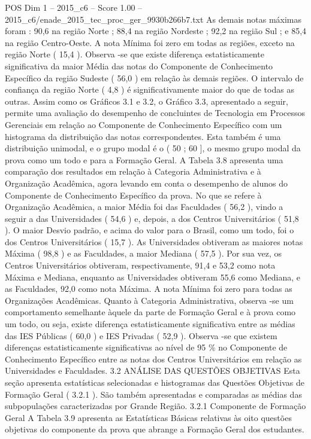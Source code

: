 \begin{textsample}{POS Dim 1 – 2015\_c6 – Score 1.00 – 2015\_c6/enade\_2015\_tec\_proc\_ger\_9930b266b7.txt}
As demais notas máximas foram : 90,6 na região Norte ; 88,4 na região Nordeste ; 92,2 na região Sul ; e 85,4 na região Centro-Oeste.
A nota Mínima foi zero em todas as regiões, exceto na região Norte ( 15,4 ).
Observa -se que existe diferença estatisticamente significativa da maior Média das notas do Componente de Conhecimento Específico da região Sudeste ( 56,0 ) em relação às demais regiões.
O intervalo de confiança da região Norte ( 4,8 ) é significativamente maior do que de todas as outras.
Assim como os Gráficos 3.1 e 3.2, o Gráfico 3.3, apresentado a seguir, permite uma avaliação do desempenho de concluintes de Tecnologia em Processos Gerenciais em relação ao Componente de Conhecimento Específico com um histograma da distribuição das notas correspondentes.
Esta também é uma distribuição unimodal, e o grupo modal é o ( 50 ; 60 ], o mesmo grupo modal da prova como um todo e para a Formação Geral.
A Tabela 3.8 apresenta uma comparação dos resultados em relação à Categoria Administrativa e à Organização Acadêmica, agora levando em conta o desempenho de alunos do Componente de Conhecimento Específico da prova.
No que se refere à Organização Acadêmica, a maior Média foi das Faculdades ( 56,2 ), vindo a seguir a das Universidades ( 54,6 ) e, depois, a dos Centros Universitários ( 51,8 ).
O maior Desvio padrão, e acima do valor para o Brasil, como um todo, foi o dos Centros Universitários ( 15,7 ).
As Universidades obtiveram as maiores notas Máxima ( 98,8 ) e as Faculdades, a maior Mediana ( 57,5 ).
Por sua vez, os Centros Universitários obtiveram, respectivamente, 91,4 e 53,2 como nota Máxima e Mediana, enquanto as Universidades obtiveram 55,6 como Mediana, e as Faculdades, 92,0 como nota Máxima.
A nota Mínima foi zero para todas as Organizações Acadêmicas.
Quanto à Categoria Administrativa, observa -se um comportamento semelhante àquele da parte de Formação Geral e à prova como um todo, ou seja, existe diferença estatisticamente significativa entre as médias das IES Públicas ( 60,0 ) e IES Privadas ( 52,9 ).
Observa -se que existem diferenças estatisticamente significativas ao nível de 95 \% no Componente de Conhecimento Específico entre as notas dos Centros Universitários em relação as Universidades e Faculdades. 3.2 ANÁLISE DAS QUESTÕES OBJETIVAS Esta seção apresenta estatísticas selecionadas e histogramas das Questões Objetivas de Formação Geral ( 3.2.1 ).
São também apresentadas e comparadas as médias das subpopulações caracterizadas por Grande Região. 3.2.1 Componente de Formação Geral A Tabela 3.9 apresenta as Estatísticas Básicas relativas às oito questões objetivas do componente da prova que abrange a Formação Geral dos estudantes.

\end{textsample}
